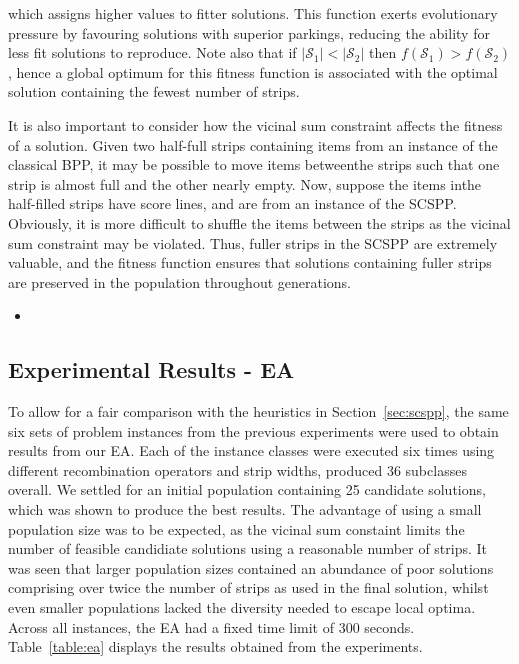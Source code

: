 \documentclass{elsarticle}
\begin{document}
\noindent which assigns higher values to fitter solutions. This function exerts evolutionary pressure by favouring solutions with superior parkings, reducing the ability for less fit solutions to reproduce. Note also that if $|\mathcal{S}_1| < |\mathcal{S}_2|$  then $f(\mathcal{S}_1) > f(\mathcal{S}_2)$, hence a global optimum for this fitness function is associated with the optimal solution containing the fewest number of strips.

It is also important to consider how the vicinal sum constraint affects the fitness of a solution. Given two half-full strips containing items from an instance of the classical BPP, it may be possible to move items betweenthe strips such that one strip is almost full and the other nearly empty. Now, suppose the items inthe half-filled strips have score lines, and are from an instance of the SCSPP. Obviously, it is more difficult to shuffle the items between the strips as the vicinal sum constraint may be violated. Thus, fuller strips in the SCSPP are extremely valuable, and the fitness function ensures that solutions containing fuller strips are preserved in the population throughout generations.

{\color{myRed}
\begin{itemize}[leftmargin=*]
	\item
\end{itemize}
}

\subsection{Experimental Results - EA}
\label{sub:expea}
\noindent To allow for a fair comparison with the heuristics in Section~\ref{sec:scspp}, the same six sets of problem instances from the previous experiments were used to obtain results from our EA. Each of the instance classes were executed six times using different recombination operators and strip widths, produced 36 subclasses overall. We settled for an initial population containing 25 candidate solutions, which was shown to produce the best results. The advantage of using a small population size was to be expected, as the vicinal sum constaint limits the number of feasible candidiate solutions using a reasonable number of strips. It was seen that larger population sizes contained an abundance of poor solutions comprising over twice the number of strips as used in the final solution, whilst even smaller populations lacked the diversity needed to escape local optima. Across all instances, the EA had a fixed time limit of 300 seconds. Table~\ref{table:ea} displays the results obtained from the experiments.
\end{document}
